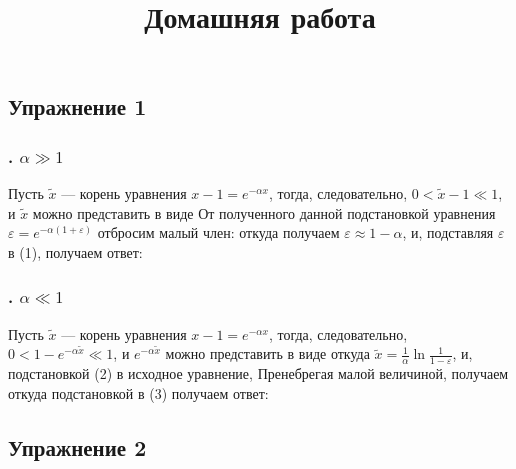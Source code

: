 \documentclass[a4paper, 12pt]{article}
\title{Домашняя работа \textnumero }
\author{}
\date{}
\begin{document}
\maketitle\thispagestyle{fancy}

\subsection*{Упражнение 1}
\subsubsection*{. $\alpha \gg 1$}
Пусть $\tilde{x}$ --- корень уравнения $x-1 = e^{-\alpha x}$, тогда,
следовательно, $0 < \tilde{x} - 1 \ll 1$, и $\tilde{x}$ можно представить в виде
От полученного данной подстановкой уравнения $\varepsilon = e^{-\alpha(1 + \varepsilon)}$ отбросим малый член:
откуда получаем $\varepsilon \approx 1 - \alpha$, и, подставляя $\varepsilon$ в (1), получаем ответ:
\subsubsection*{. $\alpha \ll 1$}
Пусть $\tilde{x}$ --- корень уравнения $x-1 = e^{-\alpha x}$, тогда,
следовательно, $0 < 1 - e^{-\alpha \tilde{x}} \ll 1$, и $e^{-\alpha \tilde{x}}$ можно представить в виде
откуда $\tilde{x} = \frac{1}{\alpha}\ln{\frac{1}{1 - \varepsilon}}$, и, подстановкой (2) в исходное уравнение,
Пренебрегая малой величиной, получаем
откуда подстановкой в (3) получаем ответ:
\subsection*{Упражнение 2}
\end{document}
